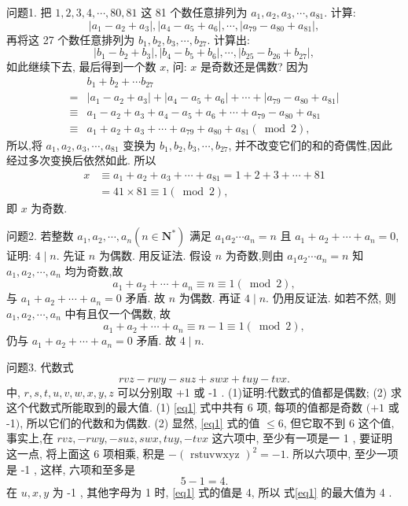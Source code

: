 
问题1. 把 $1,2,3,4, \cdots, 80,81$ 这 81 个数任意排列为 $a_1, a_2, a_3, \cdots, a_{81}$. 计算:
$$
\left|a_1-a_2+a_3\right|,\left|a_4-a_5+a_6\right|, \cdots,\left|a_{79}-a_{80}+a_{81}\right|,
$$
再将这 27 个数任意排列为 $b_1, b_2, b_3, \cdots, b_{27}$. 计算出:
$$
\left|b_1-b_2+b_3\right|,\left|b_4-b_5+b_6\right|, \cdots,\left|b_{25}-b_{26}+b_{27}\right|,
$$
如此继续下去, 最后得到一个数 $x$, 问: $x$ 是奇数还是偶数?
因为
$$
\begin{aligned}
& b_1+b_2+\cdots b_{27} \\
= & \left|a_1-a_2+a_3\right|+\left|a_4-a_5+a_6\right|+\cdots+\left|a_{79}-a_{80}+a_{81}\right| \\
\equiv & a_1-a_2+a_3+a_4-a_5+a_6+\cdots+a_{79}-a_{80}+a_{81} \\
\equiv & a_1+a_2+a_3+\cdots+a_{79}+a_{80}+a_{81}(\bmod 2),
\end{aligned}
$$
所以,将 $a_1, a_2, a_3, \cdots, a_{81}$ 变换为 $b_1, b_2, b_3, \cdots, b_{27}$, 并不改变它们的和的奇偶性,因此经过多次变换后依然如此.
所以
$$
\begin{aligned}
x & \equiv a_1+a_2+a_3+\cdots+a_{81}=1+2+3+\cdots+81 \\
& =41 \times 81 \equiv 1(\bmod 2),
\end{aligned}
$$
即 $x$ 为奇数.



问题2. 若整数 $a_1, a_2, \cdots, a_n\left(n \in \mathbf{N}^*\right)$ 满足 $a_1 a_2 \cdots a_n=n$ 且 $a_1+a_2+\cdots+a_n=0$, 证明: $4 \mid n$.
先证 $n$ 为偶数.
用反证法.
假设 $n$ 为奇数,则由 $a_1 a_2 \cdots a_n=n$ 知 $a_1, a_2, \cdots, a_n$ 均为奇数,故
$$
a_1+a_2+\cdots+a_n \equiv n \equiv 1(\bmod 2),
$$
与 $a_1+a_2+\cdots+a_n=0$ 矛盾.
故 $n$ 为偶数.
再证 $4 \mid n$. 仍用反证法.
如若不然, 则 $a_1, a_2, \cdots, a_n$ 中有且仅一个偶数, 故
$$
a_1+a_2+\cdots+a_n \equiv n-1 \equiv 1(\bmod 2),
$$
仍与 $a_1+a_2+\cdots+a_n=0$ 矛盾.
故 $4 \mid n$.



问题3. 代数式
$$
r v z-r w y-s u z+s w x+t u y-t v x . \label{eq1}
$$
中, $r, s, t, u, v, w, x, y, z$ 可以分别取 +1 或 -1 .
(1)证明:代数式的值都是偶数;
(2) 求这个代数式所能取到的最大值.
(1) \ref{eq1} 式中共有 6 项, 每项的值都是奇数 $(+1$ 或 -1$)$, 所以它们的代数和为偶数.
(2) 显然, \ref{eq1} 式的值 $\leqslant 6$, 但它取不到 6 这个值, 事实上,在
$rvz, - rwy, - suz, swx, tuy, - tvx$
这六项中, 至少有一项是一 1 , 要证明这一点, 将上面这 6 项相乘, 积是
$-(\text { rstuvwxyz })^2=-1$.
所以六项中, 至少一项是 -1 , 这样, 六项和至多是
$$
5-1=4 .
$$
在 $u, x, y$ 为 -1 , 其他字母为 1 时, \ref{eq1} 式的值是 4, 所以 式\ref{eq1} 的最大值为 4 .



